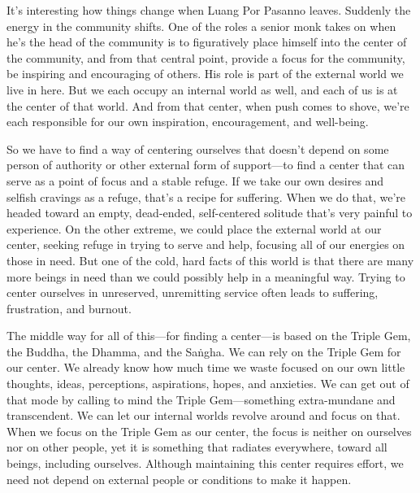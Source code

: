 
It's interesting how things change when Luang Por Pasanno leaves. 
Suddenly the energy in the community shifts. One of the roles a senior 
monk takes on when he's the head of the community is to figuratively 
place himself into the center of the community, and from that central 
point, provide a focus for the community, be inspiring and encouraging 
of others. His role is part of the external world we live in here. But 
we each occupy an internal world as well, and each of us is at the 
center of that world. And from that center, when push comes to shove, 
we're each responsible for our own inspiration, encouragement, and 
well-being.

So we have to find a way of centering ourselves that doesn't depend on 
some person of authority or other external form of support---to find a 
center that can serve as a point of focus and a stable refuge. If we 
take our own desires and selfish cravings as a refuge, that's a recipe 
for suffering. When we do that, we're headed toward an empty, 
dead-ended, self-centered solitude that's very painful to experience. 
On the other extreme, we could place the external world at our center, 
seeking refuge in trying to serve and help, focusing all of our 
energies on those in need. But one of the cold, hard facts of this 
world is that there are many more beings in need than we could possibly 
help in a meaningful way. Trying to center ourselves in unreserved, 
unremitting service often leads to suffering, frustration, and burnout.

The middle way for all of this---for finding a center---is based on the 
Triple Gem, the Buddha, the Dhamma, and the Saṅgha. We can rely on 
the Triple Gem for our center. We already know how much time we waste 
focused on our own little thoughts, ideas, perceptions, aspirations, 
hopes, and anxieties. We can get out of that mode by calling to mind 
the Triple Gem---something extra-mundane and transcendent. We can let 
our internal worlds revolve around and focus on that. When we focus on 
the Triple Gem as our center, the focus is neither on ourselves nor on 
other people, yet it is something that radiates everywhere, toward all 
beings, including ourselves. Although maintaining this center requires 
effort, we need not depend on external people or conditions to make it 
happen.


